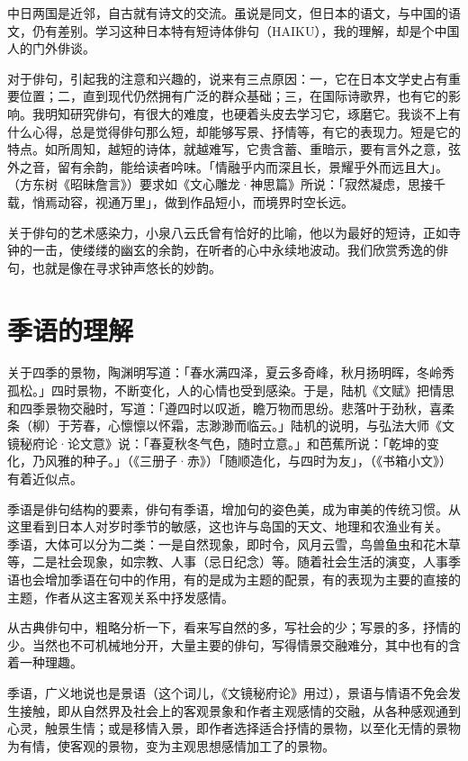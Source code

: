  {\FS
  中日两国是近邻，自古就有诗文的交流。虽说是同文，但日本的语文，与中国的语文，仍有差别。学习这种日本特有短诗体俳句（HAIKU），我的理解，却是个中国人的门外俳谈。

  对于俳句，引起我的注意和兴趣的，说来有三点原因：一，它在日本文学史占有重要位置；二，直到现代仍然拥有广泛的群众基础；三，在国际诗歌界，也有它的影响。我明知研究俳句，有很大的难度，也硬着头皮去学习它，琢磨它。我谈不上有什么心得，总是觉得俳句那么短，却能够写景、抒情等，有它的表现力。短是它的特点。如所周知，越短的诗体，就越难写，它贵含蓄、重暗示，要有言外之意，弦外之音，留有余韵，能给读者吟味。「情融乎内而深且长，景耀乎外而远且大」。（方东树《昭昧詹言》）要求如《文心雕龙·神思篇》所说：「寂然凝虑，思接千载，悄焉动容，视通万里」，做到作品短小，而境界时空长远。

  关于俳句的艺术感染力，小泉八云氏曾有恰好的比喻，他以为最好的短诗，正如寺钟的一击，使缕缕的幽玄的余韵，在听者的心中永续地波动。我们欣赏秀逸的俳句，也就是像在寻求钟声悠长的妙韵。

  \section*{\FS 季语的理解}

  关于四季的景物，陶渊明写道：「春水满四泽，夏云多奇峰，秋月扬明晖，冬岭秀孤松。」四时景物，不断变化，人的心情也受到感染。于是，陆机《文赋》把情思和四季景物交融时，写道：「遵四时以叹逝，瞻万物而思纷。悲落叶于劲秋，喜柔条（柳）于芳春，心懔懔以怀霜，志渺渺而临云。」陆机的说明，与弘法大师《文镜秘府论·论文意》说：「春夏秋冬气色，随时立意。」和芭蕉所说：「乾坤的变化，乃风雅的种子。」（《三册子·赤》）「随顺造化，与四时为友」，（《书箱小文》）有着近似点。

  季语是俳句结构的要素，俳句有季语，增加句的姿色美，成为审美的传统习惯。从这里看到日本人对岁时季节的敏感，这也许与岛国的天文、地理和农渔业有关。
  季语，大体可以分为二类：一是自然现象，即时令，风月云雪，鸟兽鱼虫和花木草等，二是社会现象，如宗教、人事（忌日纪念）等。随着社会生活的演变，人事季语也会增加季语在句中的作用，有的是成为主题的配景，有的表现为主要的直接的主题，作者从这主客观关系中抒发感情。

  从古典俳句中，粗略分析一下，看来写自然的多，写社会的少；写景的多，抒情的少。当然也不可机械地分开，大量主要的俳句，写得情景交融难分，其中也有的含着一种理趣。

  季语，广义地说也是景语（这个词儿，《文镜秘府论》用过），景语与情语不免会发生接触，即从自然界及社会上的客观景象和作者主观感情的交融，从各种感观通到心灵，触景生情；或是移情入景，即作者选择适合抒情的景物，以至化无情的景物为有情，使客观的景物，变为主观思想感情加工了的景物。

}
